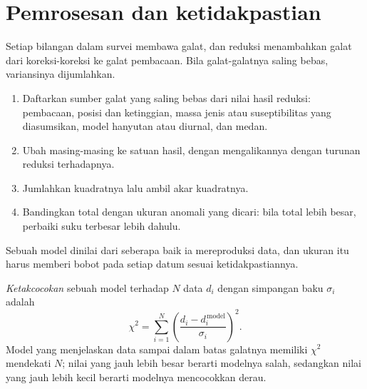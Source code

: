 \section{Pemrosesan dan ketidakpastian}\label{sec:b3:field-lab-methods-3:processing}

Setiap bilangan dalam survei membawa galat, dan reduksi menambahkan
galat dari koreksi-koreksi ke galat pembacaan. Bila galat-galatnya saling bebas,
variansinya dijumlahkan.

\begin{method}\label{met:b3:field-lab-methods-3:budget}
\begin{enumerate}
  \item Daftarkan sumber galat yang saling bebas dari nilai hasil reduksi:
        pembacaan, posisi dan ketinggian, massa jenis atau suseptibilitas
        yang diasumsikan, model hanyutan atau diurnal, dan medan.
  \item Ubah masing-masing ke satuan hasil, dengan mengalikannya dengan
        turunan reduksi terhadapnya.
  \item Jumlahkan kuadratnya lalu ambil akar kuadratnya.
  \item Bandingkan total dengan ukuran anomali yang dicari: bila total lebih
        besar, perbaiki suku terbesar lebih dahulu.
\end{enumerate}
\end{method}

Sebuah model dinilai dari seberapa baik ia mereproduksi data, dan ukuran
itu harus memberi bobot pada setiap datum sesuai ketidakpastiannya.

\begin{definition}\label{def:b3:field-lab-methods-3:inversion-practice}
\emph{Ketakcocokan} sebuah model terhadap $N$ data $d_i$ dengan
simpangan baku $\sigma_i$ adalah
\[
\chi^2 = \sum_{i=1}^N\left(\frac{d_i - d_i^{\,\mathrm{model}}}{\sigma_i}\right)^2 .
\]
Model yang menjelaskan data sampai dalam batas galatnya memiliki $\chi^2$ mendekati
$N$; nilai yang jauh lebih besar berarti modelnya salah, sedangkan nilai yang jauh
lebih kecil berarti modelnya mencocokkan derau.
\end{definition}

